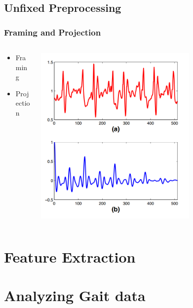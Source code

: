 \documentclass{beamer}
\begin{document}
\subsection{Unfixed Preprocessing}
\begin{frame}
  \frametitle{Framing and Projection}
  \begin{columns}
  \begin{column}{0.25\textwidth}
  \begin{itemize}
  	\item Framing
  	\linebreak
	\item Projection
  \end{itemize}
  \end{column}
  \begin{column}{0.7\textwidth}
   \includegraphics[width=0.7\textwidth]{Illustrations/ab.png}
       \\
  \end{column}
  \end{columns}
\end{frame}

\section[Gait Extraction]{Feature Extraction}
	
\section[Gait Analysis]{Analyzing Gait data}
	
\end{document}
